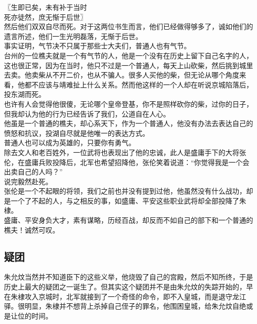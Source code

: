 \begin{multicols}{\theparacolNo}
〖生即已矣，未有补于当时\\

死亦徒然，庶无惭于后世〗\\

然后他们双双自尽而死。对于这两位书生而言，他们已经做得够多了，诚如他们的遗言所述，他们一生光明磊落，无惭于后世。\\

事实证明，气节决不只属于那些士大夫们，普通人也有气节。\\

台州的一位樵夫就是一个有气节的人，他是一个没有在历史上留下自己名字的人，这也很正常，因为在当时，他只不过是一个普通人，每天上山砍柴，然后挑到城里去卖。他卖柴从不开二价，也从不骗人。很多人买他的柴，但无论从哪个角度来看，他都不应该与靖难扯上什么关系。然而他这样的一个人却在听说京城陷落后，投东湖而死。\\

也许有人会觉得他很傻，无论哪个皇帝登基，你不是照样砍你的柴，过你的日子，但我却认为他的行为已经告诉了我们，公道自在人心。\\

他虽是一个普通的樵夫，却心系天下，作为一个普通人，他没有办法去表达自己的愤怒和抗议，投湖自尽就是他唯一的表达方式。\\

普通人也可以成为英雄的，只要你有勇气。\\

除去文人和老百姓外，一位武将也表现出了他的忠诚，此人是盛庸手下的大将张伦，在盛庸兵败投降后，北军也希望招降他，张伦笑着说道：“你觉得我是一个会出卖自己的人吗？”\\

说完毅然赴死。\\

张伦是一个不起眼的将领，我们之前也并没有提到过他，他虽然没有什么战功，却是一个了不起的人，与之相反的事，如盛庸、平安这些职业武将却全部投降了朱棣。\\

盛庸、平安身负大才，素有谋略，历经百战，却反而不如自己的部下和一个普通的樵夫！诚然可叹。\\

\subsection{疑团}
朱允炆当然并不知道臣下的这些义举，他烧毁了自己的宫殿，然后不知所终，于是历史上最大的疑团之一诞生了。但其实这个疑团并不是由朱允炆的失踪开始的，早在朱棣攻入京城时，北军就接到了一个奇怪的命令，即不入皇城，而是退守龙江驿。很明显，朱棣并不想背上杀掉自己侄子的罪名，他围困皇城，给朱允炆自绝或是让位的时间。\\


\end{multicols}
